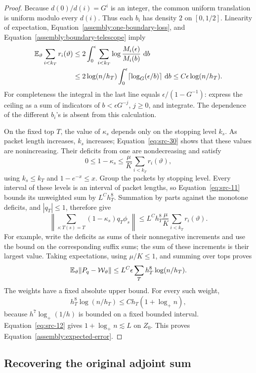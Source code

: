 \begin{proof}
Because \(d(0)/d(i)=G^i\) is an integer, the common uniform
translation is uniform modulo every \(d(i)\).  Thus each
\(b_i\) has density \(2\) on \([0,1/2]\).  Linearity of
expectation, Equation~\eqref{assembly:one-boundary-loss}, and
Equation~\eqref{assembly:boundary-telescope} imply
\begin{align}
 \mathbb E_\vartheta\sum_{i<k_T}r_i(\vartheta)
 &\le2\int_0^\epsilon
       \sum_{i<k_T}\log\frac{M_i(\epsilon)}{M_i(b)}\,\,\mathrm d b\notag\\
 &\le2\log(n/h_T)
          \int_0^\epsilon\lceil\log_G(\epsilon/b)\rceil\,\,\mathrm d b
 \le C\epsilon\log(n/h_T).
 \label{assembly:total-boundary-loss}
\end{align}
For completeness the integral in the last line equals
\(\epsilon/(1-G^{-1})\): express the ceiling as a sum of indicators
of \(b<\epsilon G^{-j}\), \(j\ge0\), and integrate.  The dependence
of the different \(b_i\)'s is absent from this calculation.

On the fixed top \(T\), the value of \(\kappa_s\) depends only on
the stopping level \(k_s\).  As packet length increases, \(k_s\)
increases; Equation~\eqref{eq:src-30} shows that these values are
nonincreasing.  Their deficits from one are nondecreasing and satisfy
\[
 0\le1-\kappa_s
       \le\frac\mu K\sum_{i<k_T}r_i(\vartheta),
\]
using \(k_s\le k_T\) and \(1-e^{-x}\le x\).
Group the packets by stopping level.  Every interval of these levels
is an interval of packet lengths, so Equation~\eqref{eq:src-11}
bounds its unweighted sum by \(L^C h_T^8\).  Summation by parts
against the monotone deficits, and \(|q_T|\le1\), therefore give
\[
 \left\|\sum_{s:T(s)=T}(1-\kappa_s)q_T\phi_s\right\|
  \le L^C h_T^8\frac\mu K\sum_{i<k_T}r_i(\vartheta).
\]
For example, write the deficits as sums of their nonnegative
increments and use the bound on the corresponding suffix sums; the
sum of these increments is their largest value.  Taking expectations,
using \(\mu/K\le1\), and summing over tops proves
\[
 \mathbb E_\vartheta\|P_q-\mathcal W_\vartheta\|
       \le L^C\epsilon\sum_T h_T^8\log(n/h_T).
\]
The weights have a fixed absolute upper bound.  For every such weight,
\[
 h_T^8\log(n/h_T)
       \le C h_T(1+\log_+ n),
\]
because \(h^7\log_+(1/h)\) is bounded on a fixed bounded interval.
Equation~\eqref{eq:src-12} gives \(1+\log_+n\lesssim L\) on
\(Z_0\).  This proves Equation~\eqref{assembly:expected-error}.
\end{proof}

\subsection{Recovering the original adjoint sum}

